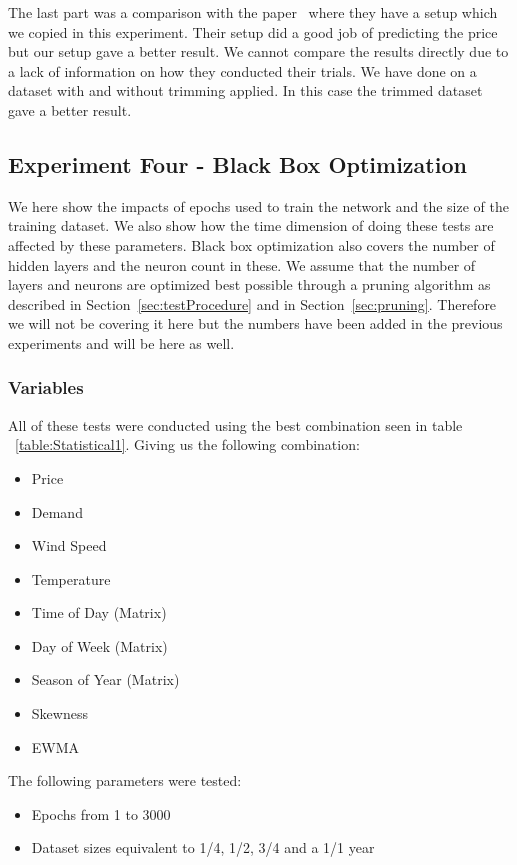 The last part was a comparison with the paper~\cite{singhal2011electricity} where they have a setup which we copied in this experiment. Their setup did a good job of predicting the price but our setup gave a better result. We cannot compare the results directly due to a lack of information on how they conducted their trials. We have done on a dataset with and without trimming applied. In this case the trimmed dataset gave a better result.

\newpage
\subsection{Experiment Four - Black Box Optimization}
\label{sec:priceExperimentFour}
We here show the impacts of epochs used to train the network and the size of the training dataset. We also show how the time dimension of doing these tests are affected by these parameters. Black box optimization also covers the number of hidden layers and the neuron count in these. We assume that the number of layers and neurons are optimized best possible through a pruning algorithm as described in Section~\ref{sec:testProcedure} and in Section~\ref{sec:pruning}. Therefore we will not be covering it here but the numbers have been added in the previous experiments and will be here as well. 

\subsubsection{Variables}
All of these tests were conducted using the best combination seen in table ~\ref{table:Statistical1}. Giving us the following combination:
\begin{itemize}
	\item Price
	\item Demand
	\item Wind Speed
	\item Temperature
	\item Time of Day (Matrix)
	\item Day of Week (Matrix)
	\item Season of Year (Matrix)
	\item Skewness
	\item EWMA
\end{itemize}

The following parameters were tested:

\begin{itemize}
	\item Epochs from 1 to 3000
	\item Dataset sizes equivalent to 1/4, 1/2, 3/4 and a 1/1 year
\end{itemize}


